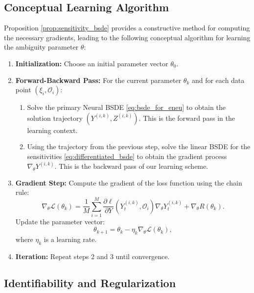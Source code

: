 \documentclass[qian]{imsart}
\theoremstyle{plain}
\theoremstyle{definition}
\begin{document}
\subsection{Conceptual Learning Algorithm}

Proposition \ref{prop:sensitivity_bsde} provides a constructive method for computing the necessary gradients, leading to the following conceptual algorithm for learning the ambiguity parameter $\theta$:

\begin{enumerate}[label=(\arabic*), leftmargin=*]
    \item \textbf{Initialization:} Choose an initial parameter vector $\theta_0$.
    \item \textbf{Forward-Backward Pass:} For the current parameter $\theta_k$ and for each data point $(\xi_i, \mathcal{O}_i)$:
    \begin{enumerate}[label=(\alph*)]
        \item Solve the primary Neural BSDE \eqref{eq:bsde_for_eneu} to obtain the solution trajectory $(Y^{(i,k)}, Z^{(i,k)})$. This is the forward pass in the learning context.
        \item Using the trajectory from the previous step, solve the linear BSDE for the sensitivities \eqref{eq:differentiated_bsde} to obtain the gradient process $\nabla_\theta Y^{(i,k)}$. This is the backward pass of our learning scheme.
    \end{enumerate}
    \item \textbf{Gradient Step:} Compute the gradient of the loss function using the chain rule:
    \[ \nabla_\theta \mathcal{L}(\theta_k) = \frac{1}{M} \sum_{i=1}^M \frac{\partial \ell}{\partial Y}(Y_t^{(i,k)}, \mathcal{O}_i) \nabla_\theta Y_t^{(i,k)} + \nabla_\theta R(\theta_k). \]
    Update the parameter vector:
    \[ \theta_{k+1} = \theta_k - \eta_k \nabla_\theta \mathcal{L}(\theta_k), \]
    where $\eta_k$ is a learning rate.
    \item \textbf{Iteration:} Repeat steps 2 and 3 until convergence.
\end{enumerate}

\subsection{Identifiability and Regularization}
\end{document}
